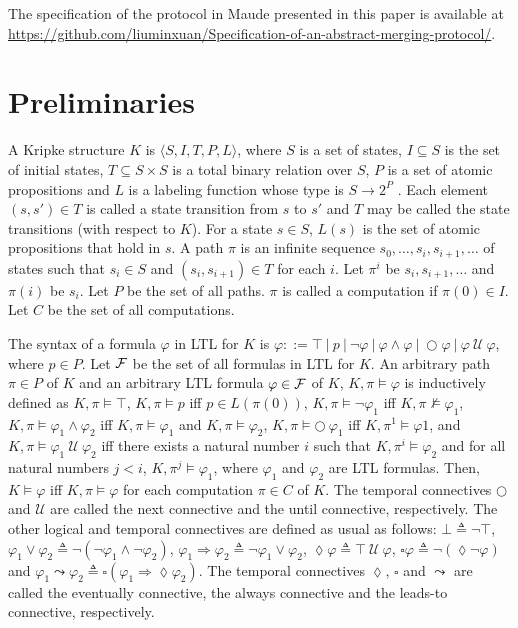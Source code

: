 \documentclass[10pt, conference, compsocconf]{IEEEtran}
\begin{document}
The specification of the protocol in Maude presented in this paper is
available at
\url{https://github.com/liuminxuan/Specification-of-an-abstract-merging-protocol/}.


\section{Preliminaries}
 \label{sect_Prel}
 
A Kripke structure $K$ is $\langle S,I,T,P,L \rangle$, where $S$ is a set
of states, $I \subseteq S$ is the set of initial states, $T \subseteq S \times S$
is a total binary relation over $S$, $P$ is a set of atomic
propositions and $L$ is a labeling function whose type is
$S \rightarrow 2^P$ . Each element $(s, s') \in T$ is called a state transition
from $s$ to $s'$ and $T$ may be called the state transitions
(with respect to $K$). For a state $s \in S$, $L(s)$ is the set
of atomic propositions that hold in $s$. A path $\pi$ is an infinite
sequence $s_0, \ldots , s_i, s_{i+1}, \ldots$ of states such that $s_i \in S$ and
$(s_i, s_{i+1}) \in T$ for each $i$. Let $\pi^i$ be $s_i, s_{i+1}, \ldots$ and $\pi(i)$ be
$s_i$. Let $P$ be the set of all paths. $\pi$ is called a computation
if $\pi(0) \in I$. Let $C$ be the set of all computations.

The syntax of a formula $\varphi$ in LTL for $K$ is $\varphi ::= \top
\:|\: p \:|\: \neg \varphi \:|\: \varphi \land \varphi \:|\: \bigcirc
\varphi \:|\: \varphi \: \mathcal{U} \: \varphi$, where $p \in P$.
Let $\cal F$ be the set of all formulas in LTL for $K$.  An arbitrary
path $\pi \in P$ of $K$ and an arbitrary LTL formula $\varphi \in \cal
F$ of $K$, $K, \pi \models \varphi$ is inductively defined as $K, \pi
\models \top$, $K, \pi \models p$ iff $p \in L(\pi(0))$, $K, \pi
\models \neg \varphi_1$ iff $K, \pi \not\models \varphi_1$, $K, \pi
\models \varphi_1 \land \varphi_2$ iff $K, \pi \models \varphi_1$ and
$K, \pi \models \varphi_2$, $K, \pi \models \bigcirc \ \varphi_1$ iff
$K, \pi^1\models \varphi1$, and $K, \pi \models \varphi_1 \:
\mathcal{U} \: \varphi_2$ iff there exists a natural number $i$ such
that $K, \pi^i\models \varphi_2$ and for all natural numbers $j < i$,
$K, \pi^j \models \varphi_1$, where $\varphi_1$ and $\varphi_2$ are
LTL formulas.  Then, $K \models \varphi$ iff $K, \pi \models \varphi$
for each computation $\pi \in C$ of $K$.  The temporal connectives
$\bigcirc$ and $\mathcal{U}$ are called the next connective and the
until connective, respectively. The other logical and temporal
connectives are defined as usual as follows: $\bot \triangleq
\neg\top$, $\varphi_1 \lor \varphi_2 \triangleq \neg(\neg\varphi_1
\land \neg\varphi_2)$, $\varphi_1 \Rightarrow \varphi_2 \triangleq
\neg\varphi_1 \lor \varphi_2$, $\lozenge \varphi \triangleq \top
\ \mathcal{U}\ \varphi$, $\square \varphi \triangleq \neg(\lozenge
\neg\varphi)$ and $\varphi_1 \leadsto \varphi_2 \triangleq \square
(\varphi_1 \Rightarrow \lozenge \varphi_2)$.  The temporal connectives
$\lozenge$, $\square$ and $\leadsto$ are called the eventually
connective, the always connective and the leads-to connective,
respectively.
\end{document}
